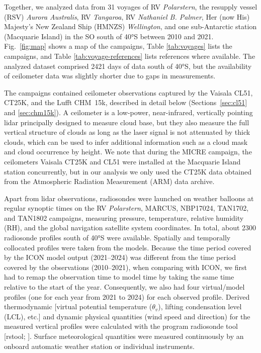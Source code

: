 \documentclass[draft]{agujournal2019}
\begin{document}
Together, we analyzed data from 31 voyages of RV \emph{Polarstern}, the resupply vessel (RSV) \emph{Aurora Australis}, RV \emph{Tangaroa}, RV \emph{Nathaniel B. Palmer}, Her (now His) Majesty's New Zealand Ship (HMNZS) \emph{Wellington}, and one sub-Antarctic station (Macquarie Island) in the SO south of 40°S between 2010 and 2021. Fig.~\ref{fig:map} shows a map of the campaigns, Table \ref{tab:voyages} lists the campaigns, and Table \ref{tab:voyage-references} lists references where available. The analyzed dataset comprised 2421 days of data south of 40°S, but the availability of ceilometer data was slightly shorter due to gaps in measurements.

The campaigns contained ceilometer observations captured by the Vaisala CL51, CT25K, and the Lufft CHM~15k, described in detail below (Sections~\ref{sec:cl51} and \ref{sec:chm15k}). A ceilometer is a low-power, near-infrared, vertically pointing lidar principally designed to measure cloud base, but they also measure the full vertical structure of clouds as long as the laser signal is not attenuated by thick clouds, which can be used to infer additional information such as a cloud mask and cloud occurrence by height. We note that during the MICRE campaign, the ceilometers Vaisala CT25K and CL51 were installed at the Macquarie Island station concurrently, but in our analysis we only used the CT25K data obtained from the Atmospheric Radiation Measurement (ARM) data archive.

Apart from lidar observations, radiosondes were launched on weather balloons at regular synoptic times on the RV \emph{Polarstern}, MARCUS, NBP17024, TAN1702, and TAN1802 campaigns, measuring pressure, temperature, relative humidity (RH), and the global navigation satellite system coordinates. In total, about 2300 radiosonde profiles south of 40°S were available. Spatially and temporally collocated profiles were taken from the models. Because the time period covered by the ICON model output (2021–2024) was different from the time period covered by the observations (2010–2021), when comparing with ICON, we first had to remap the observation time to model time by taking the same time relative to the start of the year. Consequently, we also had four virtual/model profiles (one for each year from 2021 to 2024) for each observed profile. Derived thermodynamic [virtual potential temperature ($\theta_v$), lifting condensation level (LCL), etc.] and dynamic physical quantities (wind speed and direction) for the measured vertical profiles were calculated with the program radiosonde tool [rstool; ]. Surface meteorological quantities were measured continuously by an onboard automatic weather station or individual instruments.
\end{document}
